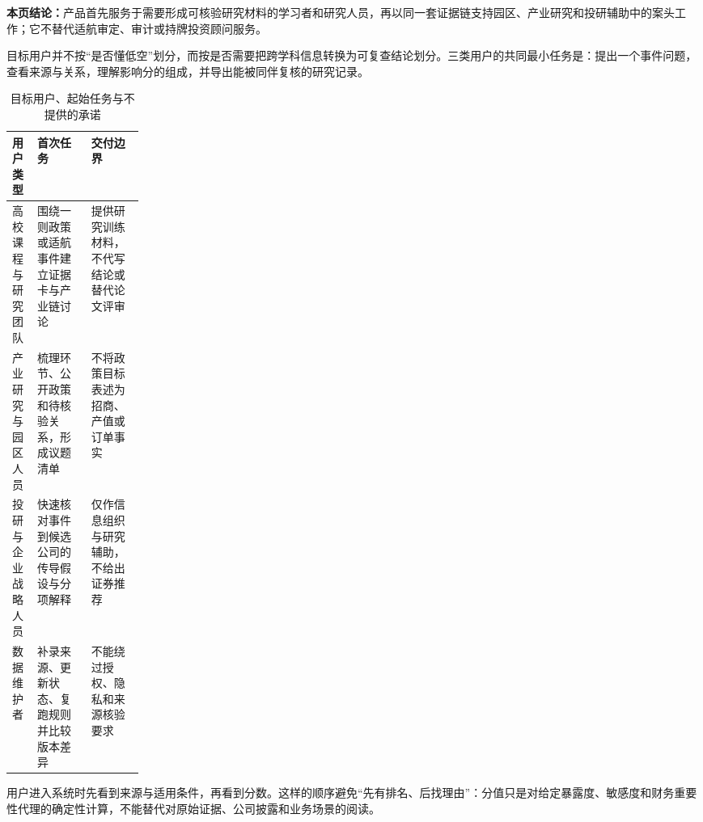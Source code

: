 
\textbf{本页结论：}产品首先服务于需要形成可核验研究材料的学习者和研究人员，再以同一套证据链支持园区、产业研究和投研辅助中的案头工作；它不替代适航审定、审计或持牌投资顾问服务。

目标用户并不按“是否懂低空”划分，而按是否需要把跨学科信息转换为可复查结论划分。三类用户的共同最小任务是：提出一个事件问题，查看来源与关系，理解影响分的组成，并导出能被同伴复核的研究记录。

\begin{table}[htbp]
\centering
\caption{目标用户、起始任务与不提供的承诺}
\label{tab:wty-user-tasks}
\small
\begin{tabularx}{\linewidth}{p{0.19\linewidth}X X}
\toprule
用户类型 & 首次任务 & 交付边界 \\
\midrule
高校课程与研究团队 & 围绕一则政策或适航事件建立证据卡与产业链讨论 & 提供研究训练材料，不代写结论或替代论文评审 \\
产业研究与园区人员 & 梳理环节、公开政策和待核验关系，形成议题清单 & 不将政策目标表述为招商、产值或订单事实 \\
投研与企业战略人员 & 快速核对事件到候选公司的传导假设与分项解释 & 仅作信息组织与研究辅助，不给出证券推荐 \\
数据维护者 & 补录来源、更新状态、复跑规则并比较版本差异 & 不能绕过授权、隐私和来源核验要求 \\
\bottomrule
\end{tabularx}
\end{table}

用户进入系统时先看到来源与适用条件，再看到分数。这样的顺序避免“先有排名、后找理由”：分值只是对给定暴露度、敏感度和财务重要性代理的确定性计算，不能替代对原始证据、公司披露和业务场景的阅读。
